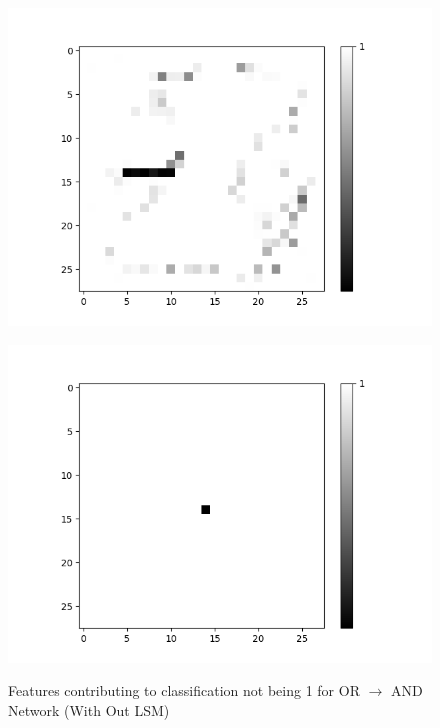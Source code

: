 \begin{minipage}[t]{0.45\textwidth}
	\vspace{0px}
	\begin{figure}[H]
		\centering
		\begin{minipage}[b]{0.45\textwidth}
			\captionsetup{labelformat=empty}
			\includegraphics[width=\textwidth]{OR-AND(WO-LSM)(1)/DontLike/True/Layer0-Neuron-28.png}
			\label{}
		\end{minipage}
	
		\medskip
	
		\begin{minipage}[b]{0.45\textwidth}
			\captionsetup{labelformat=empty}
			\includegraphics[width=\textwidth]{OR-AND(WO-LSM)(1)/DontLike/False/Layer0-Neuron-28.png}
			\label{}
		\end{minipage}
		\caption{Features contributing to classification not being 1 for OR $\rightarrow$ AND Network (With Out LSM)}
		\label{fig:or-and-net-without-lsm-neg}
		\hfill
	\end{figure}
\end{minipage}

